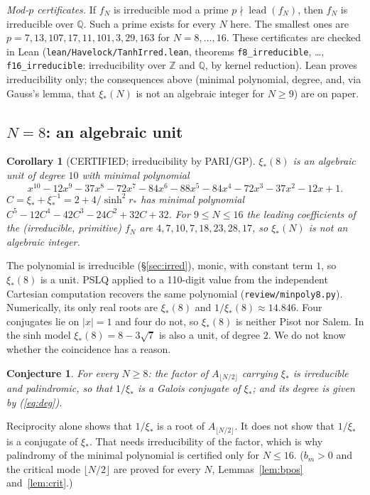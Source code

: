 \documentclass[11pt]{article}
\newtheorem{corollary}[theorem]{Corollary}
\newtheorem{conjecture}[theorem]{Conjecture}
\theoremstyle{remark}
\begin{document}
\emph{Mod-$p$ certificates.} If $f_N$ is irreducible mod a prime $p\nmid\operatorname{lead}(f_N)$, then $f_N$ is irreducible
over $\mathbb Q$. Such a prime exists for every $N$ here. The smallest ones are
$p=7,13,107,17,11,101,3,29,163$ for $N=8,\dots,16$. These certificates are checked in Lean
(\texttt{lean/Havelock/TanhIrred.lean}, theorems \texttt{f8\_irreducible}, \dots, \texttt{f16\_irreducible}: irreducibility
over $\mathbb Z$ and $\mathbb Q$, by kernel reduction). Lean proves irreducibility only; the consequences above (minimal
polynomial, degree, and, via Gauss's lemma, that $\xi_*(N)$ is not an algebraic integer for $N\ge9$) are on paper.

\subsection{$N=8$: an algebraic unit}
\begin{corollary}[CERTIFIED; irreducibility by PARI/GP]
$\xi_*(8)$ is an algebraic unit of degree $10$ with minimal polynomial
\[
x^{10}-12x^9-37x^8-72x^7-84x^6-88x^5-84x^4-72x^3-37x^2-12x+1 .
\]
$C=\xi_*+\xi_*^{-1}=2+4/\sinh^2r_*$ has minimal polynomial $C^5-12C^4-42C^3-24C^2+32C+32$.
For $9\le N\le16$ the leading coefficients of the (irreducible, primitive) $f_N$ are $4,7,10,7,18,23,28,17$, so
$\xi_*(N)$ is not an algebraic integer.
\end{corollary}
The polynomial is irreducible (\S\ref{sec:irred}), monic, with constant term $1$, so $\xi_*(8)$ is a unit. PSLQ applied to a 110-digit value from the
independent Cartesian computation recovers the same polynomial (\texttt{review/minpoly8.py}). Numerically, its
only real roots are $\xi_*(8)$ and $1/\xi_*(8)\approx14.846$. Four conjugates lie on $|x|=1$ and four do not, so $\xi_*(8)$ is
neither Pisot nor Salem. In the sinh model $\xi_*(8)=8-3\sqrt7$ is also a unit, of degree $2$. We do not know whether the
coincidence has a reason.

\begin{conjecture}\label{conj:deg}
For every $N\ge8$: the factor of $A_{\lfloor N/2\rfloor}$
carrying $\xi_*$ is irreducible and palindromic, so that $1/\xi_*$ is a Galois conjugate of $\xi_*$; and its degree is given by
(\ref{eq:deg}).
\end{conjecture}
Reciprocity alone shows that $1/\xi_*$ is a root of $A_{\lfloor N/2\rfloor}$. It does not show that $1/\xi_*$ is a conjugate
of $\xi_*$. That needs irreducibility of the factor, which is why palindromy of the minimal polynomial is certified
only for $N\le16$. ($b_m>0$ and the critical mode $\lfloor N/2\rfloor$ are proved for every $N$, Lemmas~\ref{lem:bpos}
and~\ref{lem:crit}.)
\end{document}
